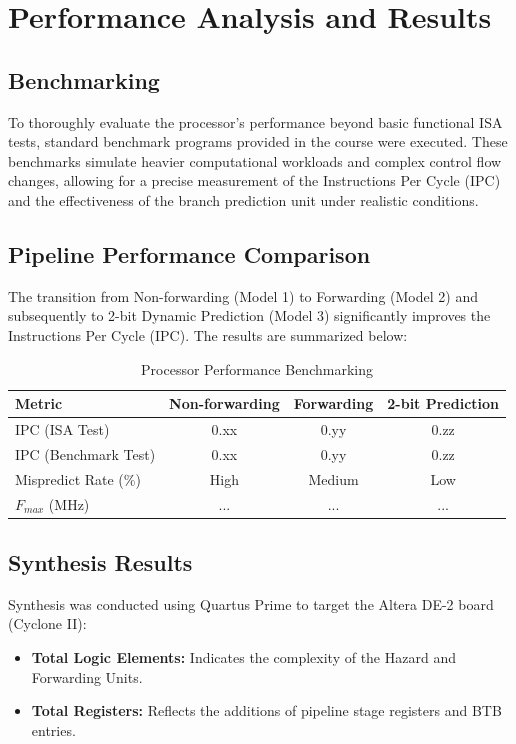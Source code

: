 \newpage
\section{Performance Analysis and Results}

\subsection{Benchmarking}
To thoroughly evaluate the processor's performance beyond basic functional ISA tests, standard benchmark programs provided in the course were executed. These benchmarks simulate heavier computational workloads and complex control flow changes, allowing for a precise measurement of the Instructions Per Cycle (IPC) and the effectiveness of the branch prediction unit under realistic conditions.

\subsection{Pipeline Performance Comparison}
The transition from Non-forwarding (Model 1) to Forwarding (Model 2) and subsequently to 2-bit Dynamic Prediction (Model 3) significantly improves the Instructions Per Cycle (IPC). The results are summarized below:

\begin{table}[h!]
	\centering
	\begin{tabular}{lccc}
		\toprule
		\textbf{Metric} & \textbf{Non-forwarding} & \textbf{Forwarding} & \textbf{2-bit Prediction} \\
		\midrule
		IPC (ISA Test) & 0.xx & 0.yy & 0.zz \\
		IPC (Benchmark Test) & 0.xx & 0.yy & 0.zz \\
		Mispredict Rate (\%) & High & Medium & Low \\
		$F_{max}$ (MHz) & ... & ... & ... \\
		\bottomrule
	\end{tabular}
	\caption{Processor Performance Benchmarking}
\end{table}

\subsection{Synthesis Results}
Synthesis was conducted using Quartus Prime to target the Altera DE-2 board (Cyclone II):
\begin{itemize}
	\item \textbf{Total Logic Elements:} Indicates the complexity of the Hazard and Forwarding Units.
	\item \textbf{Total Registers:} Reflects the additions of pipeline stage registers and BTB entries.
\end{itemize}

